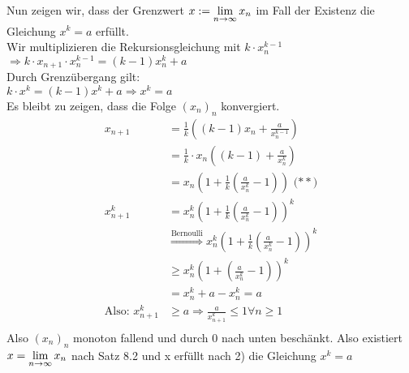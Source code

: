 \documentclass[../ana1u.tex]{subfiles}
\begin{document}
\begin{bsp}
\begin{bew}
        Nun zeigen wir, dass der Grenzwert \(x := \lim\limits_{n\rightarrow\infty} x_n\) im Fall der Existenz die Gleichung \(x^k = a\) erfüllt.\\
        Wir multiplizieren die Rekursionsgleichung mit \(k \cdot x_n^{k-1}\)\\
        \(\Rightarrow k \cdot x_{n+1} \cdot x_n^{k-1} = (k-1)x_n^k + a\)\\
        Durch Grenzübergang gilt:\\
        \(k \cdot x^k = (k-1)x^k + a \Rightarrow x^k = a \)\\
        Es bleibt zu zeigen, dass die Folge \((x_n)_n\) konvergiert.
        \begin{align*}
            x_{n+1} &= \frac{1}{k}\left((k-1)x_n + \frac{a}{x_n^{k-1}}\right)\\
            &= \frac{1}{k} \cdot x_n \left((k-1) + \frac{a}{x_n^{k}}\right)\\
            &= x_n \left(1 + \frac{1}{k}\left(\frac{a}{x_n^k} - 1\right)\right) \text{ (\(\ast \ast\))}\\
            x_{n+1}^k &= x_n^k\left(1+\frac{1}{k}\left(\frac{a}{x_n^k} - 1 \right)\right)^k\\
            &\overset{\text{Bernoulli}}{\Rightarrow} x_n^k\left(1+\frac{1}{k}\left(\frac{a}{x_n^k} - 1 \right)\right)^k\\
            &\geq x_n^k\left(1+\left(\frac{a}{x_n^k} - 1 \right)\right)^k\\
            &= x_n^k + a - x_n^k = a\\
            \text{Also: } x_{n+1}^k &\geq a \Rightarrow \frac{a}{x_{n+1}^k} \leq 1 \forall n \geq 1\\
        \end{align*}
        Also \((x_n)_n\) monoton fallend und durch 0 nach unten beschänkt. Also existiert \(x = \lim\limits_{n\rightarrow\infty} x_n\) nach Satz 8.2 und x erfüllt nach 2) die Gleichung \(x^k = a\)
    \end{bew}
\end{bsp}
\end{document}
